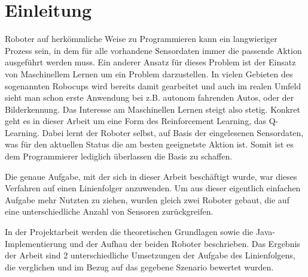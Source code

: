\chapter{Einleitung} %
\label{cha:einleitung}

Roboter auf herkömmliche Weise zu Programmieren kann ein langwieriger Prozess sein, in dem für alle vorhandene Sensordaten immer die passende Aktion ausgeführt werden muss. Ein anderer Ansatz für dieses Problem ist der Einsatz von Maschinellem Lernen um ein Problem darzustellen. In vielen Gebieten des sogenannten Robocups wird bereits damit gearbeitet und auch im realen Umfeld sieht man schon erste Anwendung bei z.B. autonom fahrenden Autos, oder der Bilderkennung. Das Interesse am Maschinellen Lernen steigt also stetig. Konkret geht es in dieser Arbeit um eine Form des Reinforcement Learning, das Q-Learning. Dabei lernt der Roboter selbst, auf Basis der eingelesenen Sensordaten, was für den aktuellen Status die am besten geeignetste Aktion ist. Somit ist es dem Programmierer lediglich überlassen die Basis zu schaffen.\par
Die genaue Aufgabe, mit der sich in dieser Arbeit beschäftigt wurde, war dieses Verfahren auf einen Linienfolger anzuwenden. Um aus dieser eigentlich einfachen Aufgabe mehr Nutzten zu ziehen, wurden gleich zwei Roboter gebaut, die auf eine unterschiedliche Anzahl von Sensoren zurückgreifen.\par
In der Projektarbeit werden die theoretischen Grundlagen sowie die Java-Im\-ple\-men\-tierung und der Aufhau der beiden Roboter beschrieben. Das Ergebnis der Arbeit sind 2 unterschiedliche Umsetzungen der Aufgabe des Linienfolgens, die verglichen und im Bezug auf das gegebene Szenario bewertet wurden.

